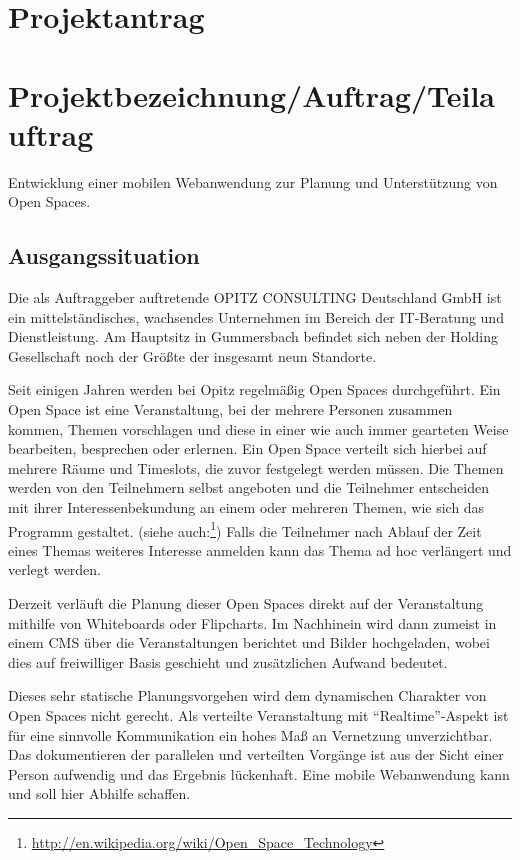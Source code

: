 \section{Projektantrag}
\section*{Projektbezeichnung/Auftrag/Teilauftrag}
Entwicklung einer mobilen Webanwendung zur Planung und Unterstützung
von Open Spaces.
\subsection*{Ausgangssituation}
Die als Auftraggeber auftretende OPITZ CONSULTING Deutschland GmbH ist
ein mittelständisches, wachsendes Unternehmen im Bereich der
IT-Beratung und Dienstleistung. Am Hauptsitz in Gummersbach befindet
sich neben der Holding Gesellschaft noch der Größte der insgesamt neun
Standorte.

\noindent Seit einigen Jahren werden bei Opitz regelmäßig Open Spaces durchgeführt.
Ein Open Space ist eine Veranstaltung, bei der mehrere Personen
zusammen kommen, Themen vorschlagen und diese in einer wie auch immer
gearteten Weise bearbeiten, besprechen oder erlernen. Ein Open Space
verteilt sich hierbei auf mehrere Räume und Timeslots, die zuvor
festgelegt werden müssen. Die Themen werden von den Teilnehmern selbst
angeboten und die Teilnehmer entscheiden mit ihrer Interessenbekundung
an einem oder mehreren Themen, wie sich das Programm gestaltet.
(siehe auch:\footnote{\url{http://en.wikipedia.org/wiki/Open_Space_Technology}})
Falls die Teilnehmer nach Ablauf der Zeit eines Themas weiteres
Interesse anmelden kann das Thema ad hoc verlängert und verlegt werden.

\noindent Derzeit verläuft die Planung dieser Open Spaces direkt auf
der Veranstaltung mithilfe von Whiteboards oder Flipcharts. Im
Nachhinein wird dann zumeist in einem \gls{CMS} über die Veranstaltungen
berichtet und Bilder hochgeladen, wobei dies auf freiwilliger Basis
geschieht und zusätzlichen Aufwand bedeutet.

\noindent Dieses sehr statische Planungsvorgehen wird dem dynamischen
Charakter von Open Spaces nicht gerecht. Als verteilte Veranstaltung
mit ``Realtime''-Aspekt ist für eine sinnvolle Kommunikation ein hohes
Maß an Vernetzung unverzichtbar. Das dokumentieren der parallelen und
verteilten Vorgänge ist aus der Sicht einer Person aufwendig und das
Ergebnis lückenhaft. Eine mobile Webanwendung kann und soll hier
Abhilfe schaffen.

